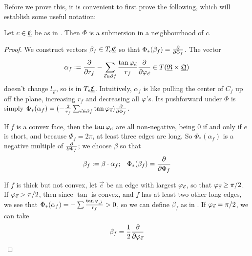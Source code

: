 Before we prove this, it is convenient to first prove the following,
which will establish some useful notation:

\begin{lemma}
\label{l:Phi_full}
Let $c \in {\underline{\mathfrak{C}}}$ be as in .
Then $\Phi$ is a submersion in a neighbourhood of $c$.
\end{lemma}

\begin{proof}
We construct vectors $\beta_f \in T_c {\underline{\mathfrak{C}}}$ so that
$\Phi_*(\beta_f) = {\frac{\partial}{\partial \Phi_f}}$.
The vector
\begin{equation}
\label{e:alpha_f}
\alpha_f := {\frac{\partial}{\partial r_f}} - \sum_{\vec{e} \in \partial f} 
	\frac{\tan \varphi_{\vec{e}}}{r_f} {\frac{\partial}{\partial \varphi_{\vec{e}}}}
	\in T({\underline{\mathfrak{R}}} \times {\underline{\mathfrak{Q}}})
\end{equation}
doesn't change $l_{\vec{e}}$,
so is in $T_c {\underline{\mathfrak{C}}}$.
Intuitively, $\alpha_f$ is like
pulling the center of $C_f$ up off the plane, increasing $r_f$ and decreasing all
$\varphi$'s.
Its pushforward under $\Phi$ is simply
$\Phi_*(\alpha_f) =
	(-\frac{2}{r_f} \sum_{\vec{e}\in \partial f} \tan \varphi_{\vec{e}})
	{\frac{\partial}{\partial \Phi_f}}$.


If $f$ is a convex face, then the $\tan \varphi_{\vec{e}}$ are all non-negative,
being 0 if and only if $e$ is short,
and because $\Phi_f = 2\pi$, at least three edges are long.
So $\Phi_*(\alpha_f)$ is a negative multiple of ${\frac{\partial}{\partial \Phi_f}}$;
we choose $\beta$ so that
\begin{equation}
\label{e:beta_f_convex}
\beta_f := \beta \cdot \alpha_f; \;\;\;
\Phi_*(\beta_f) = {\frac{\partial}{\partial \Phi_f}}
\end{equation}

If $f$ is thick but not convex,
let $\vec{e}$ be an edge with largest $\varphi_{\vec{e}}$,
so that $\varphi_{\vec{e}} \geq \pi/2$.
If $\varphi_{\vec{e}} > \pi/2$,
then since $\tan$ is convex, and $f$ has at least two other
long edges,
we see that $\Phi_*(\alpha_f) = -\sum \frac{\tan \varphi_{\vec{e'}}}{r_f} > 0$,
so we can define $\beta_f$ as in .
If $\varphi_{\vec{e}} = \pi/2$,
we can take
\[
\beta_f = \frac{1}{2} {\frac{\partial}{\partial \varphi_{\vec{e}}}}
\]




\end{proof}
